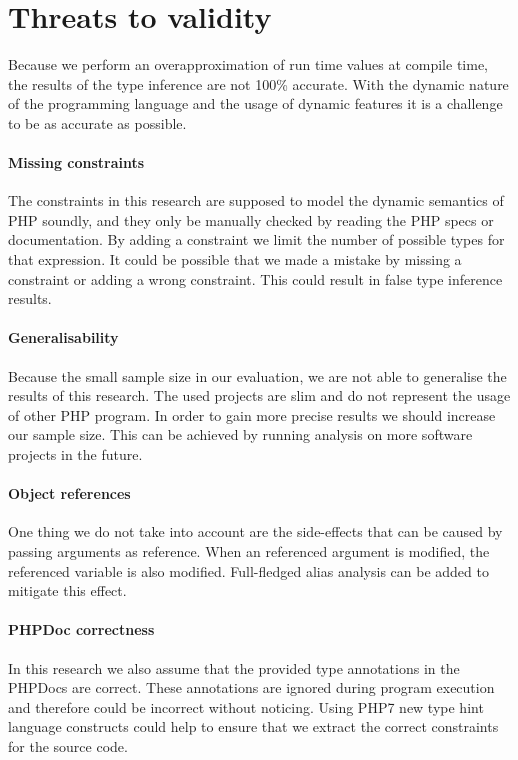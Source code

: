 \documentclass[main.tex]{subfiles}
\begin{document}
    \section{Threats to validity}\label{conclusion:threats-to-validity}	
    Because we perform an overapproximation of run time values at compile time, the results of the type inference are not 100\% accurate.
    With the dynamic nature of the programming language and the usage of dynamic features it is a challenge to be as accurate as possible.
		
	\paragraph{Missing constraints}
	The constraints in this research are supposed to model the dynamic semantics of PHP soundly, and they only be manually checked by reading the PHP specs or documentation\footnotemark{}.
	By adding a constraint we limit the number of possible types for that expression.
	It could be possible that we made a mistake by missing a constraint or adding a wrong constraint.
	This could result in false type inference results.
	
	\paragraph{Generalisability}
	Because the small sample size in our evaluation, we are not able to generalise the results of this research.
	The used projects are slim and do not represent the usage of other PHP program.
	In order to gain more precise results we should increase our sample size.
	This can be achieved by running analysis on more software projects in the future.
	
	\paragraph{Object references}
	One thing we do not take into account are the side-effects that can be caused by passing arguments as reference.
	When an referenced argument is modified, the referenced variable is also modified.
	Full-fledged alias analysis can be added to mitigate this effect.
	
	\paragraph{PHPDoc correctness}
	In this research we also assume that the provided type annotations in the PHPDocs are correct.
	These annotations are ignored during program execution and therefore could be incorrect without noticing.
	Using PHP7 new type hint language constructs could help to ensure that we extract the correct constraints for the source code.
\end{document}
